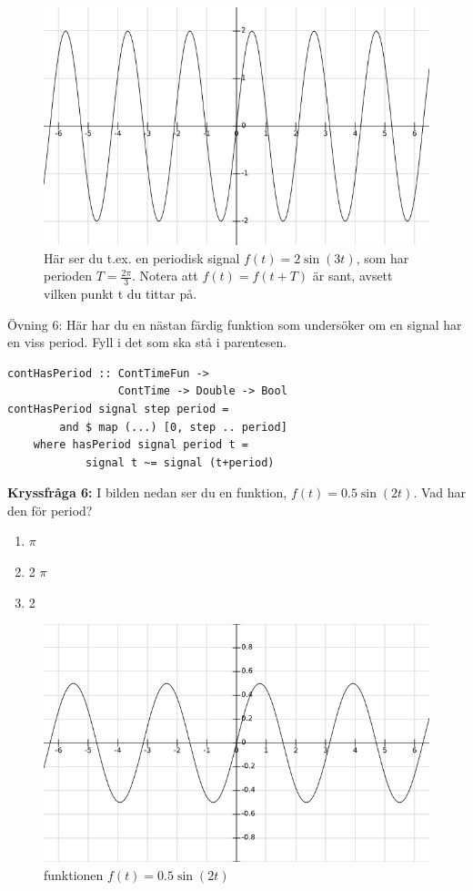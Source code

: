 \documentclass{article}
\begin{document}
\begin{figure}[ht]
\centerline{\includegraphics[scale=0.55]{image12.png}}
\caption{Här ser du t.ex. en periodisk signal $f(t)=2 \sin(3 t)$, som har perioden $T=\frac{2\pi}{3}$. Notera att $f(t)=f(t+T)$ är sant, avsett vilken punkt t du tittar på.}
\label{}
\end{figure}
\newpage
Övning 6: Här har du en nästan färdig funktion som undersöker om en signal har en viss period. Fyll i det som ska stå i parentesen.
\begin{verbatim}
contHasPeriod :: ContTimeFun ->
                 ContTime -> Double -> Bool
contHasPeriod signal step period =
        and $ map (...) [0, step .. period]
    where hasPeriod signal period t =
            signal t ~= signal (t+period)
\end{verbatim}

\textbf{Kryssfråga 6:} I bilden nedan ser du en funktion, $f(t)=0.5\sin(2t)$. Vad har den för period?
\begin{enumerate}[label={\alph*)},font={\bfseries}]
    \item $\pi$
    \item 2 $\pi$
    \item 2
\end{enumerate}

\begin{figure}[ht]
\centerline{\includegraphics[scale=0.50]{image08.png}}
\caption{funktionen $f(t) = 0.5 \sin(2t)$}
\label{}
\end{figure}
\end{document}
